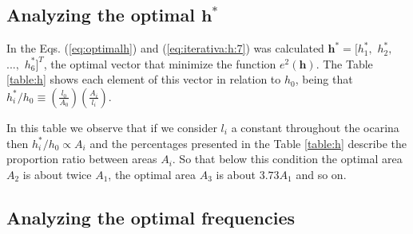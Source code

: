 \documentclass[11pt,twocolumn]{article}
\begin{document}
\subsection{Analyzing the optimal $\mathbf{h^*}$}
In the Eqs. (\ref{eq:optimalh}) and (\ref{eq:iterativa:h:7}) 
was calculated $\mathbf{h^*}=[h_1^*,$ $h_2^*,$ $...,$ $h_6^*]^{T}$, 
the optimal vector that minimize the function $e^2(\mathbf{h})$. 
The Table \ref{table:h} shows each element of this vector in relation to $h_0$, 
being that $ h_{i}^*/h_{0} \equiv  \left( \frac{l_0}{A_0}\right) \left( \frac{A_{i}}{l_{i}}    \right)$.
\begin{table}[h]
\center
{}
\caption{Percentage ratio between $h_{i}^*$ and $h_{0}$.}
\label{table:h}
\end{table}

In this table we observe that if 
we consider $l_{i}$ a constant throughout the ocarina 
then $h_{i}^*/h_{0} \propto A_{i}$ and 
the percentages presented in the Table \ref{table:h} describe the proportion ratio between areas $A_i$.
So that below this condition 
the optimal area $A_{2}$ is about twice $A_{1}$, 
the optimal area $A_{3}$ is about $3.73 A_{1}$   
and so on.




\subsection{Analyzing the optimal frequencies}
\end{document}
